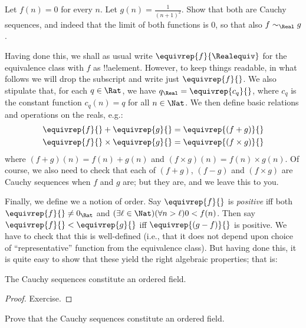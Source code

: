 \documentclass[../../../include/open-logic-section]{subfiles}
\begin{document}
\begin{prob}
Let $f(n) = 0$ for every $n$. Let $g(n) = \frac{1}{(n+1)^2}$. Show
that both are Cauchy sequences, and indeed that the limit of both
functions is $0$, so that also $f \sim_\Real g$. 
\end{prob}

Having done this, we shall as usual write $\equivrep{f}{\Realequiv}$
for the equivalence class with $f$ as !!a{element}. However, to keep
things readable, in what follows we will drop the subscript and write
just $\equivrep{f}{}$. We also stipulate that, for each $q \in \Rat$,
we have $q_{\Real} = \equivrep{c_{q}}{}$, where $c_{q}$ is the
constant function $c_q(n) = q$ for all $n \in \Nat$. We then define
basic relations and operations on the reals, e.g.:
\begin{align*}
	\equivrep{f}{} + \equivrep{g}{} &= 	\equivrep{(f + g)}{} \\
	\equivrep{f}{} \times 	\equivrep{g}{} &= \equivrep{(f \times g)}{} 
\end{align*}
where $(f + g)(n) = f(n) + g(n)$ and $(f \times g)(n) = f(n) \times
g(n)$. Of course, we also need to check that each of  $(f + g)$,
$(f-g)$ and $(f\times g)$ are Cauchy sequences when $f$ and $g$ are;
but they are, and we leave this to you.

Finally, we define we a notion of order. Say $\equivrep{f}{}$ is
\emph{positive} iff both $\equivrep{f}{}\neq 0_\Rat$ and $(\exists
\ell \in \Nat)(\forall n > \ell)0 < f(n)$. Then say $\equivrep{f}{} <
\equivrep{g}{}$ iff $\equivrep{(g - f)}{}$ is positive. We have to
check that this is well-defined (i.e., that it does not depend upon
choice of ``representative'' function from the equivalence class). 
But having done this, it is quite easy to show that these yield the
right algebraic properties; that is:
\begin{thm}
The Cauchy sequences constitute an ordered field.
\end{thm}

\begin{proof}
Exercise. 
\end{proof}

\begin{prob}
Prove that the Cauchy sequences constitute an ordered field.
\end{prob}
\end{document}
